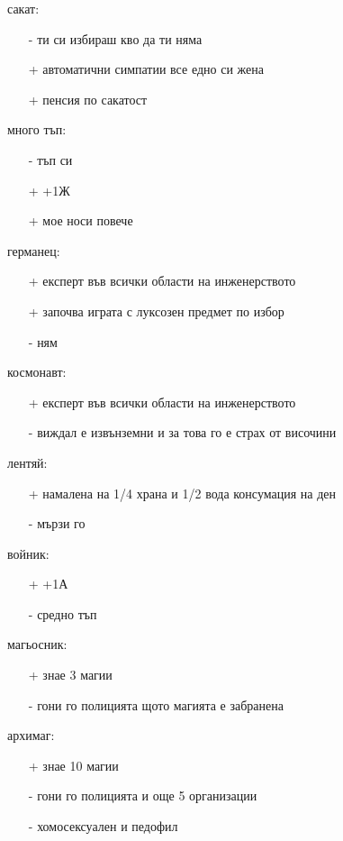 \documentclass{article}
\begin{document}
сакат:
\begin{itemize}
\item[-] ти си избираш кво да ти няма
\item[+] автоматични симпатии все едно си жена
\item[+] пенсия по сакатост
\end{itemize}

много тъп:
\begin{itemize}
\item[-] тъп си
\item[+] +1Ж
\item[+] мое носи повече
\end{itemize}

германец:
\begin{itemize}
\item[+] експерт във всички области на инженерството
\item[+] започва играта с луксозен предмет по избор
\item[-] ням
\end{itemize}

космонавт:
\begin{itemize}
\item[+] експерт във всички области на инженерството
\item[-] виждал е извънземни и за това го е страх от височини
\end{itemize}

лентяй:
\begin{itemize}
\item[+] намалена на 1/4 храна и 1/2 вода консумация на ден
\item[-] мързи го
\end{itemize}

войник:
\begin{itemize}
\item[+] +1А
\item[-] средно тъп
\end{itemize}

магьосник:
\begin{itemize}
\item[+] знае 3 магии
\item[-] гони го полицията щото магията е забранена
\end{itemize}

архимаг:
\begin{itemize}
\item[+] знае 10 магии
\item[-] гони го полицията и още 5 организации
\item[-] хомосексуален и педофил
\end{itemize}
\end{document}
